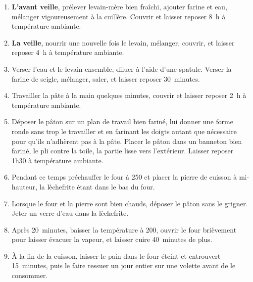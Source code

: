 
\begin{ingredients}
\end{ingredients}

\begin{recipe}
  \begin{enumerate}

  \item \textbf{L'avant veille}, prélever levain-mère bien fraîchi,
    ajouter farine et eau, mélanger vigoureusement à la cuillère.
    Couvrir et laisser reposer 8~h à température ambiante.
    
  \item \textbf{La veille}, nourrir une nouvelle fois le levain,
    mélanger, couvrir, et laisser reposer 4~h à température ambiante.
    
  \item Verser l'eau et le levain ensemble, diluer à l'aide d'une
    spatule.  Verser la farine de seigle, mélanger, saler, et laisser
    reposer 30~minutes.
    
  \item Travailler la pâte à la main quelques minutes, couvrir et
    laisser reposer 2~h à température ambiante.
    
  \item Déposer le pâton sur un plan de travail bien fariné, lui
    donner une forme ronde sans trop le travailler et en farinant les
    doigts autant que nécessaire pour qu'ils n'adhèrent pas à la
    pâte.  Placer le pâton dans un banneton bien fariné, le pli contre
    la toile, la partie lisse vers l'extérieur.  Laisser reposer 1h30
    à température ambiante.
    
  \item Pendant ce temps préchauffer le four à 250\degreeC{} et placer la
    pierre de cuisson à mi-hauteur, la lèchefrite étant dans le bas du
    four.
    
  \item Lorsque le four et la pierre sont bien chauds, déposer le
    pâton sans le grigner.  Jeter un verre d'eau dans la lèchefrite.
    
  \item Après 20~minutes, baisser la température à 200\degreeC, ouvrir le
    four brièvement pour laisser évacuer la vapeur, et laisser cuire
    40~minutes de plus.
    
  \item À la fin de la cuisson, laisser le pain dans le four éteint et
    entrouvert 15~minutes, puis le faire ressuer un jour entier sur
    une volette avant de le consommer.
    

  \end{enumerate}
\end{recipe}

